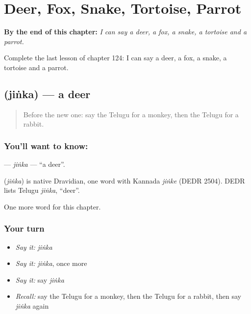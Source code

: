 
\chapter{Deer, Fox, Snake, Tortoise, Parrot}
\label{ch:te-deer-fox-snake-tortoise-parrot}

\begin{chapteropening}
\textbf{By the end of this chapter:} \emph{I can say a deer, a fox, a snake, a tortoise and a parrot.}

Complete the last lesson of chapter 124: I can say a deer, a fox, a snake, a tortoise and a parrot.
\end{chapteropening}

\section[\texorpdfstring{\te{జింక} (jiṅka)}{జింక (jiṅka)}]{ (jiṅka) — a deer}

\label{lesson:TE-C124-jinka}



\begin{quote}
Before the new one: say the Telugu for a monkey, then the Telugu for a rabbit.
\end{quote}

\subsection*{You'll want to know: }
\textbf{} — \emph{jiṅka} — \textquotedblleft{}a deer\textquotedblright{}.

\begin{cousinweb}
\textbf{} (\emph{jiṅka}) is native Dravidian, one word with Kannada \emph{jiṅke} (DEDR 2504). DEDR lists Telugu \emph{jiṅka}, \textquotedblleft{}deer\textquotedblright{}.
\end{cousinweb}

\begin{grammarlens}[title={What you've built}]
One more word for this chapter.
\end{grammarlens}

\subsection*{Your turn}
\begin{itemize}
\raggedright
  \item \emph{Say it:} \emph{jiṅka}
  \item \emph{Say it:} \emph{jiṅka}, once more
  \item \emph{Say it:} say \emph{jiṅka}
  \item \emph{Recall:} say the Telugu for a monkey, then the Telugu for a rabbit, then say \emph{jiṅka} again
\end{itemize}

